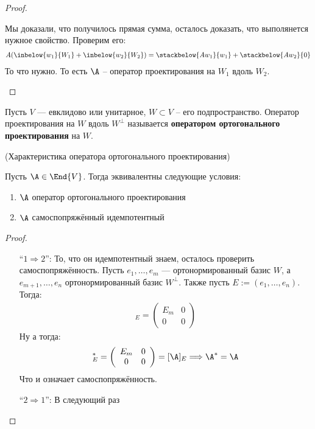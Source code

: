 \begin{theorem}
\begin{proof}
\begin{itemize}
                Мы доказали, что получилось прямая сумма, осталось доказать, что выполянется нужное свойство. Проверим его: 
                \begin{gather*}
                    A(\inbelow{w_1}{W_1}  + \inbelow{w_2}{W_2} ) = \stackbelow{A w_1}{w_1}  + \stackbelow{A w_2}{0}
                \end{gather*}
                То что нужно. То есть $\A$ -- оператор проектирования на $W_1$ вдоль $W_2$. 
        \end{itemize}
    \end{proof}
\end{theorem}

\begin{conj}
    Пусть $V$ --- евклидово или унитарное, $W \subset V$ -- его подпространство. 
    Оператор проектирования на $W$ вдоль $W^{\perp}$ называется \textbf{оператором ортогонального проектирования} на $W$.
\end{conj}

\begin{theorem} (Характеристика оператора ортогонального проектирования)

    Пусть $\A \in \End{V}$. 
    Тогда эквивалентны следующие условия:
    \begin{enumerate}
        \item $\A$ оператор ортогонального проектирования
        \item $\A$ самоспопряжённый идемпотентный
    \end{enumerate}

    \begin{proof} \quad 
    
    \begin{itemize}
        \item[``$1 \Rightarrow 2$'':]
            То, что он идемпотентный знаем, осталось проверить самоспопряжённость. 
            Пусть $e_1, \dots, e_m$ --- ортонормированный базис $W$, а $e_{m + 1}, \dots, e_n$ ортонормированный базис $W^{\perp}$.
            Также пусть $E := (e_1, \dots, e_n)$. Тогда:
            \begin{gather*}
                [\A]_E = \left(\begin{array}{cc}
                E_m & 0 \\ 
                0 & 0
                \end{array}\right)
            \end{gather*}
            Ну а тогда:    
            \begin{gather*}
                [\A]^*_E = \left(\begin{array}{cc}
                E_m & 0 \\ 
                0 & 0
                \end{array}\right) = [\A]_E \Longrightarrow \A^* = \A
            \end{gather*}
            Что и означает самоспопряжённость.
        \item[``$2 \Rightarrow 1$'':]  
            В следующий раз
    \end{itemize}
    \end{proof}
\end{theorem}